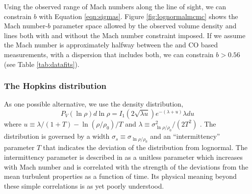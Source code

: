 Using the observed range of Mach numbers along the \north line of sight, we can
constrain $b$ with Equation \ref{eqn:sigmas}.  Figure \ref{fig:lognormalmcmc} shows the Mach number-$b$
parameter space allowed by the observed volume density and \formaldehyde lines
both with and without the Mach number constraint imposed.  If we assume the Mach number
is approximately halfway between the \formaldehyde and CO based measurements, with
a dispersion that includes both, we can constrain $b>0.56$ (see Table \ref{tab:datafits}).


\subsubsection{The Hopkins distribution}
As one possible alternative, we use the
\citet{Hopkins2013a} density distribution,
\begin{equation}
    \label{eqn:hopkins}
    P_V (\ln \rho) d \ln \rho = I_1 (2 \sqrt{\lambda u}) e^{-(\lambda+u)} \lambda du
\end{equation}
where $u \equiv \lambda/(1+T) - \ln(\rho/\rho_0)/T$ and $\lambda\equiv \sigma^2_{\ln \rho/\rho_0} / (2 T^2)$ \citep[Equation 5
in ][modified such that $\rho_0$ is not assumed to be unity]{Hopkins2013a}.
The distribution is governed by a width
$\sigma_s \equiv \sigma_{\ln \rho/\rho_0}$ and an ``intermittency'' parameter $T$ that indicates the deviation of
the distribution from lognormal.  The intermittency parameter is described in
\citet{Hopkins2013a} as a unitless parameter which increases with Mach number
and is correlated with the strength of the deviations from the mean turbulent
properties as a function of time.  Its physical meaning beyond these simple
correlations is as yet poorly understood.

